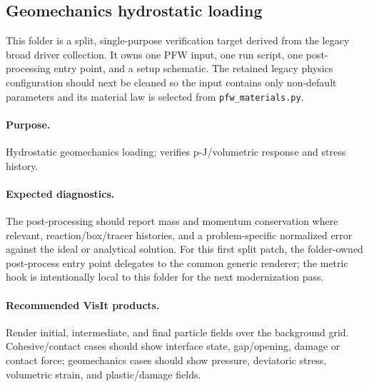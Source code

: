 \subsection{Geomechanics hydrostatic loading}
\label{sec:geomechanicsHydrostatic}

This folder is a split, single-purpose verification target derived from the
legacy broad driver collection.  It owns one PFW input, one run script, one
post-processing entry point, and a setup schematic.  The retained legacy physics
configuration should next be cleaned so the input contains only non-default
parameters and its material law is selected from \texttt{pfw\_materials.py}.

\paragraph{Purpose.} Hydrostatic geomechanics loading; verifies p-J/volumetric response and stress history.

\paragraph{Expected diagnostics.} The post-processing should report mass and
momentum conservation where relevant, reaction/box/tracer histories, and a
problem-specific normalized error against the ideal or analytical solution.  For
this first split patch, the folder-owned post-process entry point delegates to
the common generic renderer; the metric hook is intentionally local to this
folder for the next modernization pass.

\paragraph{Recommended VisIt products.} Render initial, intermediate, and final
particle fields over the background grid.  Cohesive/contact cases should show
interface state, gap/opening, damage or contact force; geomechanics cases should
show pressure, deviatoric stress, volumetric strain, and plastic/damage fields.

